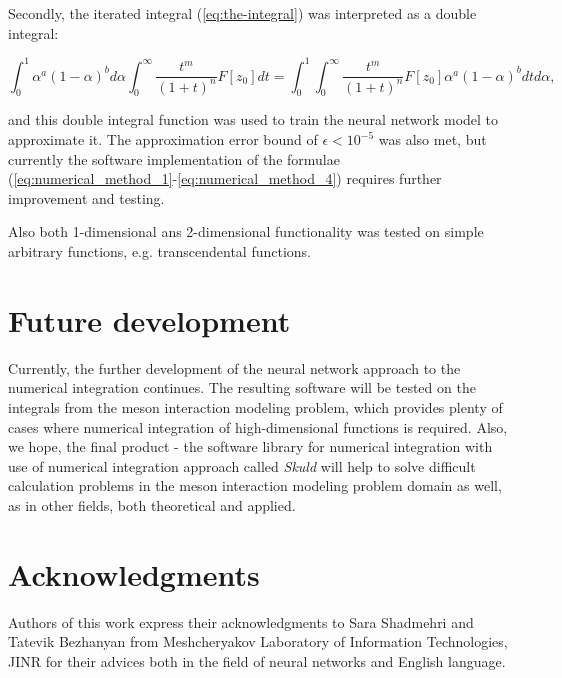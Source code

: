\documentclass[%
]{ittmm}
\begin{document}
Secondly, the iterated integral (\ref{eq:the-integral}) was interpreted as a double integral:

\begin{equation}
    \label{eq:iterated-as-double}
     \int_{0}^{1} \alpha^{a}(1 - \alpha)^bd\alpha \int_{0}^{\infty}\frac{t^m}{(1+t)^n}F[z_{0}]dt = 
     \int_{0}^{1} \int_{0}^{\infty}\frac{t^m}{(1+t)^n}F[z_{0}]\alpha^{a}(1 - \alpha)^bdtd\alpha ,
\end{equation}

\noindent and this double integral function was used to train the neural network model to approximate it. The approximation error bound of $\epsilon < 10^{-5}$ was also met, but currently the software implementation of the formulae (\ref{eq:numerical_method_1}-\ref{eq:numerical_method_4}) requires further improvement and testing.

Also both 1-dimensional ans 2-dimensional functionality was tested on simple arbitrary functions, e.g. transcendental functions.

\section{Future development}

Currently, the further development of the neural network approach to the numerical integration continues. The resulting software will be tested on the integrals from the meson interaction modeling problem, which provides plenty of cases where numerical integration of high-dimensional functions is required. Also, we hope, the final product - the software library for numerical integration with use of numerical integration approach called \textit{Skuld} will help to solve difficult calculation problems in the meson interaction modeling problem domain as well, as in other fields, both theoretical and applied.

\section{Acknowledgments}

Authors of this work express their acknowledgments to Sara Shadmehri and Tatevik Bezhanyan from Meshcheryakov Laboratory of Information Technologies, JINR for their advices both in the field of neural networks and English language.


\end{document}
